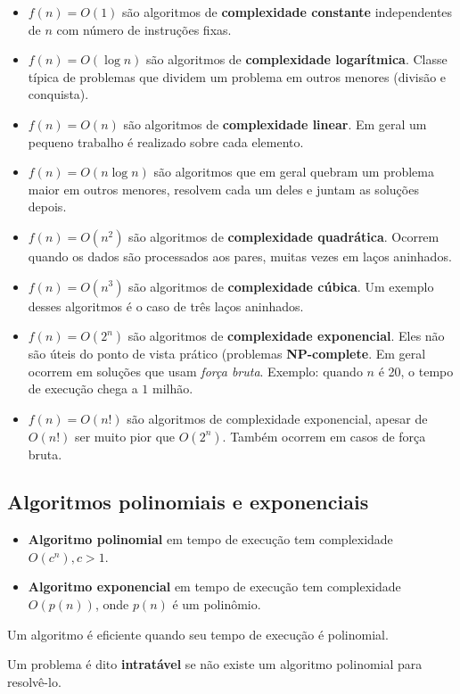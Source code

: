 \begin{itemize}
\item $f(n) = O(1)$ são algoritmos de {\bf complexidade constante}
independentes de $n$ com número de instruções fixas.

\item $f(n) = O(\log n)$ são algoritmos de {\bf complexidade logarítmica}.
Classe típica de problemas que dividem um problema em outros menores (divisão e conquista).

\item $f(n) = O(n)$ são algoritmos de {\bf complexidade linear}. Em geral 
um pequeno trabalho é realizado sobre cada elemento.

\item $f(n) = O(n \log n)$ são algoritmos que em geral quebram um problema maior em outros
menores, resolvem cada um deles e juntam as soluções depois.

\item $f(n) = O(n^2)$ são algoritmos de {\bf complexidade quadrática}. 
Ocorrem quando os dados são processados aos pares, muitas vezes em laços aninhados.

\item $f(n) = O(n^3)$ são algoritmos de \textbf{complexidade cúbica}. Um exemplo
desses algoritmos é o caso de três laços aninhados.

\item $f(n) = O(2^n)$ são algoritmos de \textbf{complexidade exponencial}. Eles
não são úteis do ponto de vista prático (problemas \textbf{NP-complete}.
Em geral ocorrem em soluções que usam \textit{força bruta}. Exemplo: quando $n$ é 20,
o tempo de execução chega a $1$ milhão.

\item $f(n) = O(n!)$ são algoritmos de complexidade exponencial, apesar
de $O(n!)$ ser muito pior que $O(2^n)$. Também ocorrem em casos de força bruta.
\end{itemize}

\subsection{Algoritmos polinomiais e exponenciais}

\begin{itemize}
\item {\bf Algoritmo polinomial} em tempo de execução tem complexidade $O(c^n), c > 1$.
\item {\bf Algoritmo exponencial} em tempo de execução tem complexidade $O(p(n))$, onde
$p(n)$ é um polinômio.
\end{itemize}


\begin{framed}
\centering
Um algoritmo é eficiente quando seu tempo de execução é polinomial.
\end{framed}

Um problema é dito \textbf{intratável} se não existe um algoritmo polinomial para resolvê-lo.
